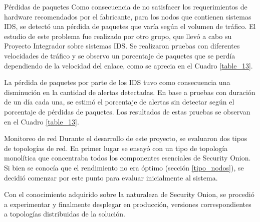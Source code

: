     \begin{subsection}{Pérdidas de paquetes}
    Como consecuencia de no satisfacer los requerimientos de hardware recomendados por el fabricante, para los nodos que contienen sistemas IDS, se detectó una pérdida de paquetes que varía según el volumen de tráfico. El estudio de este problema fue realizado por otro grupo, que llevó a cabo su Proyecto Integrador sobre sistemas IDS. Se realizaron pruebas con diferentes velocidades de tráfico y se observo un porcentaje de paquetes que se perdía dependiendo de la velocidad del enlace, como se aprecia en el Cuadro \ref{table_13}.\par
    \begin{table}[H]
    \caption{Perdida de paquetes y alertas no detectadas, según la velocidad del enlace}
    \label{table_13}
    \end{table}
    La pérdida de paquetes por parte de los IDS tuvo como consecuencia una disminución en la cantidad de alertas detectadas. En base a pruebas con duración de un día cada una, se estimó el porcentaje de alertas sin detectar según el porcentaje de pérdidas de paquetes. Los resultados de estas pruebas se observan en el Cuadro \ref{table_13}.
    \end{subsection}
    \begin{section}{Monitoreo de red}
    Durante el desarrollo de este proyecto, se evaluaron dos tipos de topologías de red. En primer lugar se ensayó con un tipo de topología monolítica que concentraba todos los componentes esenciales de Security Onion. Si bien se conocía que el rendimiento no era óptimo (sección \ref{tipo_nodos}), se decidió comenzar por este punto para evaluar inicialmente al sistema. \par      
    Con el conocimiento adquirido sobre la naturaleza de Security Onion, se procedió a experimentar y finalmente desplegar en producción, versiones correspondientes a topologías distribuidas de la solución. \par
    \end{section}
